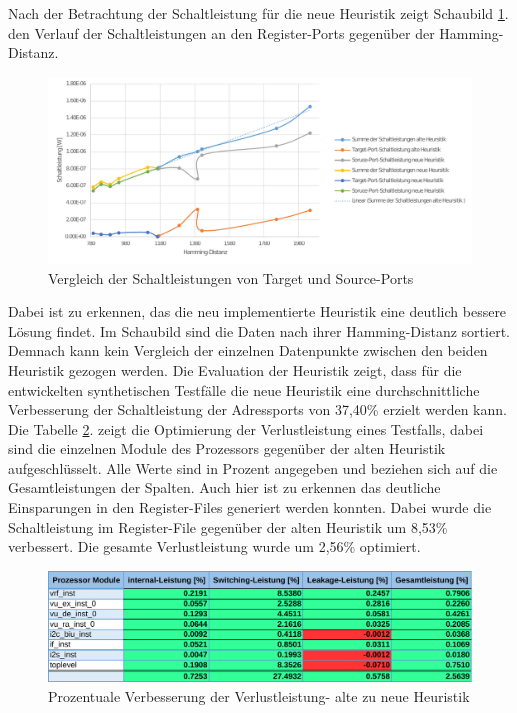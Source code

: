Nach der Betrachtung der Schaltleistung für die neue Heuristik zeigt Schaubild \ref{fig:heuristic_schaltleistung_alt_neu}. den Verlauf der Schaltleistungen an den Register-Ports gegenüber der Hamming-Distanz. 

\begin{figure}[H]
	\centering
	\includegraphics[width=\textwidth]{fig/heuristik_schaltleistung_alt_neu.pdf}
	\caption{Vergleich der Schaltleistungen von Target und Source-Ports}
	\label{fig:heuristic_schaltleistung_alt_neu}
\end{figure}

Dabei ist zu erkennen, das die neu implementierte Heuristik eine deutlich bessere Lösung findet. Im Schaubild sind die Daten nach ihrer Hamming-Distanz sortiert. Demnach kann kein Vergleich der einzelnen Datenpunkte zwischen den beiden Heuristik gezogen werden. 
Die Evaluation der Heuristik zeigt, dass für die entwickelten synthetischen Testfälle die neue Heuristik eine durchschnittliche Verbesserung der Schaltleistung der Adressports von 37,40\% erzielt werden kann.\\
Die Tabelle \ref{fig:compare_power_heuristic}. zeigt die Optimierung der Verlustleistung eines Testfalls, dabei sind die einzelnen Module des Prozessors gegenüber der alten Heuristik aufgeschlüsselt. Alle Werte sind in Prozent angegeben und beziehen sich auf die Gesamtleistungen der Spalten. Auch hier ist zu erkennen das deutliche Einsparungen in den Register-Files generiert werden konnten. Dabei wurde die Schaltleistung im Register-File gegenüber der alten Heuristik um 8,53\% verbessert. Die gesamte Verlustleistung wurde um 2,56\% optimiert. 

\begin{figure}[H]
	\centering
	\includegraphics[width=\textwidth]{fig/compare_power_heuristic.pdf}
	\caption{Prozentuale Verbesserung der Verlustleistung- alte zu neue Heuristik}
	\label{fig:compare_power_heuristic}
\end{figure}


